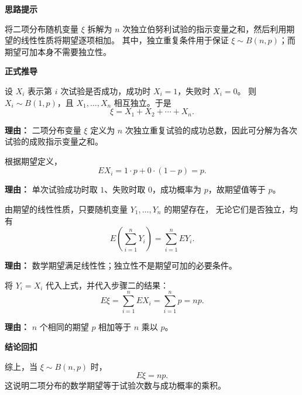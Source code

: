 \begin{proofbox}
	\textbf{\textcolor{CProof}{思路提示}}

	将二项分布随机变量 $\xi$ 拆解为 $n$ 次独立伯努利试验的指示变量之和，然后利用期望的线性性质将期望逐项相加。
	其中，独立重复条件用于保证 $\xi\sim B(n,p)$；而期望可加本身不需要独立性。

	\medskip
	\textbf{\textcolor{CProof}{正式推导}}
	\begin{description}[style=nextline, leftmargin=2.8em, labelsep=0.5em, itemsep=0.55em]
		\item[\textbf{步骤一（变量分解）：}]
		      设 $X_i$ 表示第 $i$ 次试验是否成功，成功时 $X_i=1$，失败时 $X_i=0$。
		      则 $X_i\sim B(1,p)$，且 $X_1,\dots,X_n$ 相互独立。于是
		      \[
			      \xi = X_1 + X_2 + \cdots + X_n .
		      \]
		      \par\textbf{理由：} 二项分布变量 $\xi$ 定义为 $n$ 次独立重复试验的成功总数，因此可分解为各次试验的成败指示变量之和。

		\item[\textbf{步骤二（伯努利期望）：}]
		      根据期望定义，
		      \[
			      E X_i = 1\cdot p + 0\cdot(1-p) = p .
		      \]
		      \par\textbf{理由：} 单次试验成功时取 $1$、失败时取 $0$，成功概率为 $p$，故期望值等于 $p$。

		\item[\textbf{步骤三（期望线性）：}]
		      由期望的线性性质，只要随机变量 $Y_1,\dots,Y_n$ 的期望存在，
		      无论它们是否独立，均有
		      \[
			      E\!\left(\sum_{i=1}^n Y_i\right)
			      =
			      \sum_{i=1}^n E Y_i .
		      \]
		      \par\textbf{理由：} 数学期望满足线性性；独立性不是期望可加的必要条件。

		\item[\textbf{步骤四（代入求和）：}]
		      将 $Y_i=X_i$ 代入上式，并代入步骤二的结果：
		      \[
			      E\xi = \sum_{i=1}^n E X_i = \sum_{i=1}^n p = np .
		      \]
		      \par\textbf{理由：} $n$ 个相同的期望 $p$ 相加等于 $n$ 乘以 $p$。
	\end{description}

	\medskip
	\textbf{\textcolor{CProof}{结论回扣}}

	综上，当 $\xi\sim B(n,p)$ 时，
	\[
		E\xi=np.
	\]
	这说明二项分布的数学期望等于试验次数与成功概率的乘积。
\end{proofbox}